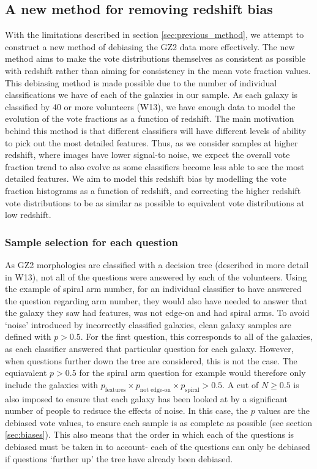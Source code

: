 \documentclass[useAMS,usenatbib]{mn2e}
\begin{document}
\subsection{A new method for removing redshift bias}
\label{sec:new_method}

With the limitations described in section \ref{sec:previous_method}, we attempt to construct a new method of debiasing the GZ2 data more effectively. The new method aims to make the vote distributions themselves as consistent  as possible with redshift rather than aiming for consistency in the mean vote fraction values. This debiasing method is made possible due to the number of individual classifications we have of each of the galaxies in our sample. As each galaxy is classified by 40 or more volunteers (W13), we have enough data to model the evolution of the vote fractions as a function of redshift. The main motivation behind this method is that different classifiers will have different levels of ability to pick out the most detailed features. Thus, as we consider samples at higher redshift, where images have lower signal-to noise, we expect the overall vote fraction trend to also evolve as some classifiers become less able to see the most detailed features. We aim to model this redshift bias by modelling the vote fraction histograms as a function of redshift, and correcting the higher redshift vote distributions to be as similar as possible to equivalent vote distributions at low redshift.

\subsubsection{Sample selection for each question}

As GZ2 morphologies are classified with a decision tree (described in more detail in W13), not all of the questions were answered by each of the volunteers. Using the example of spiral arm number, for an individual classifier to have answered the question regarding arm number, they would also have needed to answer that the galaxy they saw had features, was not edge-on and had spiral arms. To avoid `noise' introduced by incorrectly classified galaxies, clean galaxy samples are defined with $p > 0.5$. For the first question, this corresponds to all of the galaxies, as each classifier answered that particular question for each galaxy. However, when questions further down the tree are considered, this is not the case. The equiavalent $p>0.5$ for the spiral arm question for example would therefore only include the galaxies with $p_{\textrm{features}} \times p_{\textrm{not edge-on}} \times p_{\textrm{spiral}} > 0.5$. A cut of $N \geq 0.5$ is also imposed to ensure that each galaxy has been looked at by a significant number of people to redsuce the effects of noise. In this case, the $p$ values are the debiased vote values, to ensure each sample is as complete as possible (see section \ref{sec:biases}). This also means that the order in which each of the questions is debiased must be taken in to account- each of the questions can only be debiased if questions `further up' the tree have already been debiased.
\end{document}
